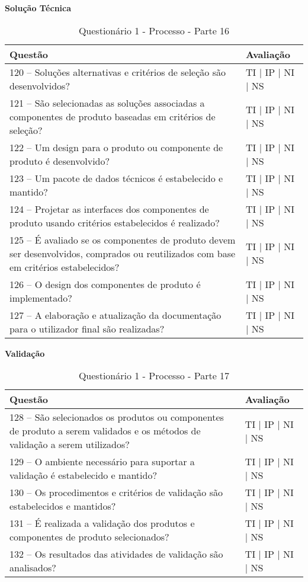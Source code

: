 \documentclass[openany,10pt,a4paper]{article}
\begin{document}
\begin{appendix}
\begin{table}[h]
\textbf{Solução Técnica}
\centering
	\caption{Questionário 1 - Processo - Parte 16}
	\begin{tabular}{p{3.5in}p{2in}}		
		\toprule
		\textbf{Questão}  & \textbf{Avaliação}\\ 
		\midrule
		120 – Soluções alternativas e critérios de seleção são desenvolvidos?
 & TI | IP | NI | NS \\
        \midrule
		121 – São selecionadas as soluções associadas a componentes de produto baseadas em critérios 
de seleção?
 & TI | IP | NI | NS \\
		\midrule
		122 – Um design para o produto ou componente de produto é desenvolvido?
 & TI | IP | NI | NS \\
		\midrule
        123 – Um pacote de dados técnicos é estabelecido e mantido?
 & TI | IP | NI | NS \\
		\midrule
		124 – Projetar as interfaces dos componentes de produto usando critérios estabelecidos é 
realizado? 
  & TI | IP | NI | NS \\
		\midrule
		125 – É avaliado se os componentes de produto devem ser desenvolvidos, comprados ou 
reutilizados com base em critérios estabelecidos? 
 & TI | IP | NI | NS \\
 \midrule
		126 – O design dos componentes de produto é implementado?
 & TI | IP | NI | NS \\
        \midrule
        127 – A elaboração e atualização da documentação para o utilizador final são realizadas?
 & TI | IP | NI | NS \\
		\bottomrule
	\end{tabular} 
	\label{tab:tabela1}
\end{table}

\begin{table}[h]
\textbf{Validação}
	\centering
	\caption{Questionário 1 - Processo - Parte 17}
	\begin{tabular}{p{3.5in}p{2in}}		
		\toprule
		\textbf{Questão}  & \textbf{Avaliação}\\ 
		\midrule
		128 – São selecionados os produtos ou componentes de produto a serem validados e os 
métodos de validação a serem utilizados?
 & TI | IP | NI | NS \\
        \midrule
		129 – O ambiente necessário para suportar a validação é estabelecido e mantido?
 & TI | IP | NI | NS \\
		\midrule
		130 – Os procedimentos e critérios de validação são estabelecidos e mantidos?
 & TI | IP | NI | NS \\
		\midrule
        131 – É realizada a validação dos produtos e componentes de produto selecionados?
 & TI | IP | NI | NS \\
		\midrule
		132 – Os resultados das atividades de validação são analisados?
  & TI | IP | NI | NS \\
		\bottomrule
	\end{tabular} 
	\label{tab:tabela1}
\end{table}


\end{appendix}
\end{document}
